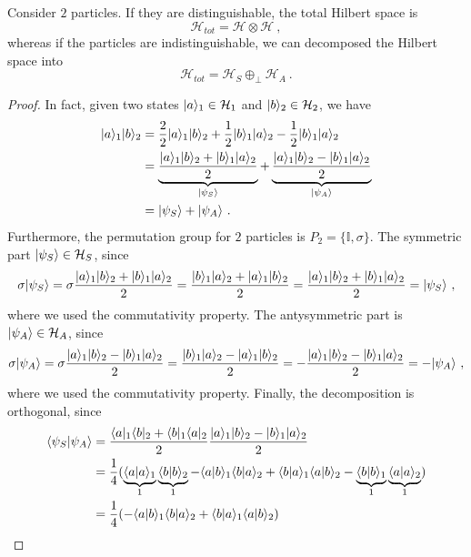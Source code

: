     Consider $2$ particles. If they are distinguishable, the total Hilbert space is 
    \begin{equation*}
        \mathcal H_{tot} = \mathcal H \otimes \mathcal H ~,
    \end{equation*}
    whereas if the particles are indistinguishable, we can decomposed the Hilbert space into
    \begin{equation*}
        \mathcal H_{tot} = \mathcal H_S \oplus_\perp  \mathcal H_A ~.
    \end{equation*} 
    \begin{proof}
        In fact, given two states $\vert a\rangle_1 \in \mathcal H_1$ and $\vert b\rangle_2 \in \mathcal H_2$, we have 
    \begin{equation*}
    \begin{aligned}
        \vert a\rangle_1\vert b\rangle_2 & = \frac{2}{2} \vert a\rangle_1\vert b\rangle_2 + \frac{1}{2} \vert b\rangle_1\vert a\rangle_2 - \frac{1}{2} \vert b\rangle_1\vert a\rangle_2 \\ & = \underbrace{\frac{\vert a\rangle_1\vert b\rangle_2 + \vert b\rangle_1\vert a\rangle_2}{2}}_{\vert\psi_S\rangle} + \underbrace{\frac{\vert a\rangle_1\vert b\rangle_2 - \vert b\rangle_1\vert a\rangle_2}{2}}_{\vert\psi_A\rangle} \\ & = \vert\psi_S\rangle + \vert\psi_A\rangle ~.
    \end{aligned}
    \end{equation*}
    Furthermore, the permutation group for $2$ particles is $P_2 = \{\mathbb I, \sigma\}$. The symmetric part $\vert\psi_S\rangle \in \mathcal H_S$, since
    \begin{equation*}
        \sigma \vert\psi_S\rangle = \sigma \frac{\vert a\rangle_1\vert b\rangle_2 + \vert b\rangle_1\vert a\rangle_2}{2} = \frac{\vert b\rangle_1\vert a\rangle_2 + \vert a\rangle_1\vert b\rangle_2}{2} = \frac{\vert a\rangle_1\vert b\rangle_2 + \vert b\rangle_1\vert a\rangle_2}{2} = \vert\psi_S\rangle ~,
    \end{equation*}
    where we used the commutativity property. The antysymmetric part is $\vert\psi_A\rangle \in \mathcal H_A$, since
    \begin{equation*}
        \sigma \vert\psi_A\rangle = \sigma \frac{\vert a\rangle_1\vert b\rangle_2 - \vert b\rangle_1\vert a\rangle_2}{2} = \frac{\vert b\rangle_1\vert a\rangle_2 - \vert a\rangle_1\vert b\rangle_2}{2} = - \frac{\vert a\rangle_1\vert b\rangle_2 - \vert b\rangle_1\vert a\rangle_2}{2} = - \vert\psi_A\rangle ~,
    \end{equation*}
    where we used the commutativity property. Finally, the decomposition is orthogonal, since 
    \begin{equation*}
    \begin{aligned}
        \braket{\psi_S}{\psi_A} & = \frac{\bra{a}_1\bra{b}_2 + \bra{b}_1\bra{a}_2}{2} \frac{\ket{a}_1 \ket{b}_2 - \ket{b}_1 \ket{a}_2}{2} \\ & = \frac{1}{4} (\underbrace{\braket{a}{a}_1}_1 \underbrace{\braket{b}{b}_2}_1 - \braket{a}{b}_1 \braket{b}{a}_2 + \braket{b}{a}_1 \braket{a}{b}_2 - \underbrace{\braket{b}{b}_1}_1 \underbrace{\braket{a}{a}_2}_1) \\ & = \frac{1}{4} (- \braket{a}{b}_1 \braket{b}{a}_2 + \braket{b}{a}_1 \braket{a}{b}_2)  

\end{aligned}
\end{equation*}
\end{proof}
